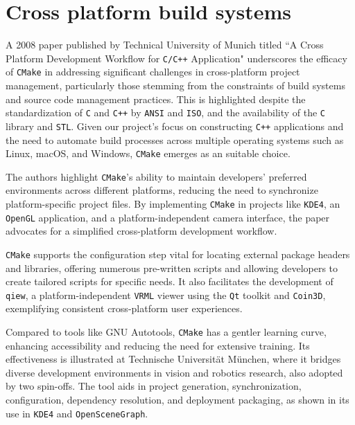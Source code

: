 \section{Cross platform build systems}

A 2008 paper published by Technical University of Munich titled  ``A Cross Platform Development Workflow for \texttt{C/C++} Application"\cite{cmake_publication_1} underscores the efficacy of \texttt{CMake} in addressing significant challenges in cross-platform project management, particularly those stemming from the constraints of build systems and source code management practices. This is highlighted despite the standardization of \texttt{C} and \texttt{C++} by \texttt{ANSI} and \texttt{ISO}, and the availability of the \texttt{C} library and \texttt{STL}. Given our project's focus on constructing \texttt{C++} applications and the need to automate build processes across multiple operating systems such as Linux, macOS, and Windows, \texttt{CMake} emerges as an suitable choice. 

The authors highlight \texttt{CMake}'s ability to maintain developers' preferred environments across different platforms, reducing the need to synchronize platform-specific project files. By implementing \texttt{CMake} in projects like \texttt{KDE4}, an \texttt{OpenGL} application, and a platform-independent camera interface, the paper advocates for a simplified cross-platform development workflow.

\texttt{CMake} supports the configuration step vital for locating external package headers and libraries, offering numerous pre-written scripts and allowing developers to create tailored scripts for specific needs. It also facilitates the development of \texttt{qiew}, a platform-independent \texttt{VRML} viewer using the \texttt{Qt} toolkit and \texttt{Coin3D}, exemplifying consistent cross-platform user experiences.

Compared to tools like GNU Autotools, \texttt{CMake} has a gentler learning curve, enhancing accessibility and reducing the need for extensive training. Its effectiveness is illustrated at Technische Universität München, where it bridges diverse development environments in vision and robotics research, also adopted by two spin-offs. The tool aids in project generation, synchronization, configuration, dependency resolution, and deployment packaging, as shown in its use in \texttt{KDE4} and \texttt{OpenSceneGraph}.

